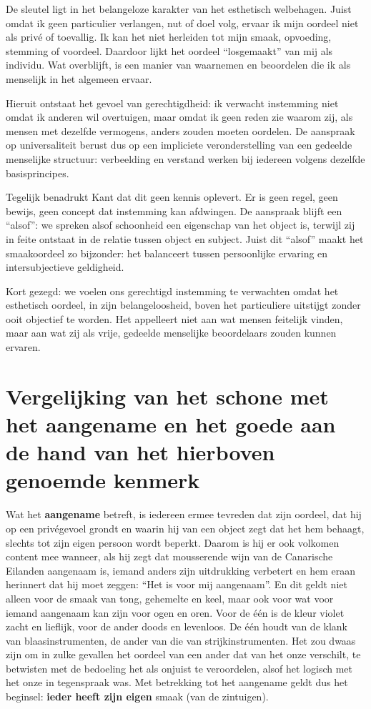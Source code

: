 \begin{mdframed}[leftmargin=0pt,rightmargin=0pt,backgroundcolor=blue!6,linecolor=white,innertopmargin=6pt,innerbottommargin=6pt]
De sleutel ligt in het belangeloze karakter van het esthetisch welbehagen. Juist omdat ik geen particulier verlangen, nut of doel volg, ervaar ik mijn oordeel niet als privé of toevallig. Ik kan het niet herleiden tot mijn smaak, opvoeding, stemming of voordeel. Daardoor lijkt het oordeel “losgemaakt” van mij als individu. Wat overblijft, is een manier van waarnemen en beoordelen die ik als menselijk in het algemeen ervaar.

Hieruit ontstaat het gevoel van gerechtigdheid: ik verwacht instemming niet omdat ik anderen wil overtuigen, maar omdat ik geen reden zie waarom zij, als mensen met dezelfde vermogens, anders zouden moeten oordelen. De aanspraak op universaliteit berust dus op een impliciete veronderstelling van een gedeelde menselijke structuur: verbeelding en verstand werken bij iedereen volgens dezelfde basisprincipes.

Tegelijk benadrukt Kant dat dit geen kennis oplevert. Er is geen regel, geen bewijs, geen concept dat instemming kan afdwingen. De aanspraak blijft een “alsof”: we spreken alsof schoonheid een eigenschap van het object is, terwijl zij in feite ontstaat in de relatie tussen object en subject. Juist dit “alsof” maakt het smaakoordeel zo bijzonder: het balanceert tussen persoonlijke ervaring en intersubjectieve geldigheid.

Kort gezegd: we voelen ons gerechtigd instemming te verwachten omdat het esthetisch oordeel, in zijn belangeloosheid, boven het particuliere uitstijgt zonder ooit objectief te worden. Het appelleert niet aan wat mensen feitelijk vinden, maar aan wat zij als vrije, gedeelde menselijke beoordelaars zouden kunnen ervaren.
\end{mdframed}

\section{Vergelijking van het schone met het aangename en het goede aan de hand van het hierboven genoemde kenmerk}

Wat het \textbf{aangename} betreft, is iedereen ermee tevreden dat zijn oordeel, dat hij op een privégevoel grondt en waarin hij van een object zegt dat het hem behaagt, slechts tot zijn eigen persoon wordt beperkt. Daarom is hij er ook volkomen content mee wanneer, als hij zegt dat mousserende wijn van de Canarische Eilanden aangenaam is, iemand anders zijn uitdrukking verbetert en hem eraan herinnert dat hij moet zeggen: “Het is voor mij aangenaam”. En dit geldt niet alleen voor de smaak van tong, gehemelte en keel, maar ook voor wat voor iemand aangenaam kan zijn voor ogen en oren. Voor de één is de kleur violet zacht en lieflijk, voor de ander doods en levenloos. De één houdt van de klank van blaasinstrumenten, de ander van die van strijkinstrumenten. Het zou dwaas zijn om in zulke gevallen het oordeel van een ander dat van het onze verschilt, te betwisten met de bedoeling het als onjuist te veroordelen, alsof het logisch met het onze in tegenspraak was. Met betrekking tot het aangename geldt dus het beginsel: \textbf{ieder heeft zijn eigen} smaak (van de zintuigen).

